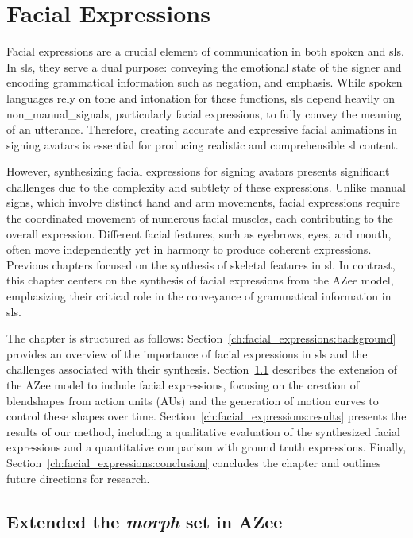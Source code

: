 \documentclass[../../main]{subfiles}
\begin{document}
\chapter{Facial Expressions}
\label{ch:facial_expressions}

Facial expressions are a crucial element of communication in both spoken and \gls{sl}s. In \gls{sl}s, they serve a dual purpose: conveying the emotional state of the signer and encoding grammatical information such as negation, and emphasis. While spoken languages rely on tone and intonation for these functions, \gls{sl}s depend heavily on \gls{non_manual_signals}, particularly facial expressions, to fully convey the meaning of an utterance. Therefore, creating accurate and expressive facial animations in signing avatars is essential for producing realistic and comprehensible \gls{sl} content.

However, synthesizing facial expressions for signing avatars presents significant challenges due to the complexity and subtlety of these expressions. Unlike manual signs, which involve distinct hand and arm movements, facial expressions require the coordinated movement of numerous facial muscles, each contributing to the overall expression. Different facial features, such as eyebrows, eyes, and mouth, often move independently yet in harmony to produce coherent expressions. Previous chapters focused on the synthesis of skeletal features in \gls{sl}. In contrast, this chapter centers on the synthesis of facial expressions from the AZee model, emphasizing their critical role in the conveyance of grammatical information in \gls{sl}s.

The chapter is structured as follows: Section~\ref{ch:facial_expressions:background} provides an overview of the importance of facial expressions in \gls{sl}s and the challenges associated with their synthesis. Section~\ref{ch:facial_expressions:adding_facial_expressions_to_azee} describes the extension of the AZee model to include facial expressions, focusing on the creation of blendshapes from action units (AUs) and the generation of motion curves to control these shapes over time. Section~\ref{ch:facial_expressions:results} presents the results of our method, including a qualitative evaluation of the synthesized facial expressions and a quantitative comparison with ground truth expressions. Finally, Section~\ref{ch:facial_expressions:conclusion} concludes the chapter and outlines future directions for research.

\section{Extended the \emph{morph} set in AZee}
\label{ch:facial_expressions:adding_facial_expressions_to_azee}
\end{document}

